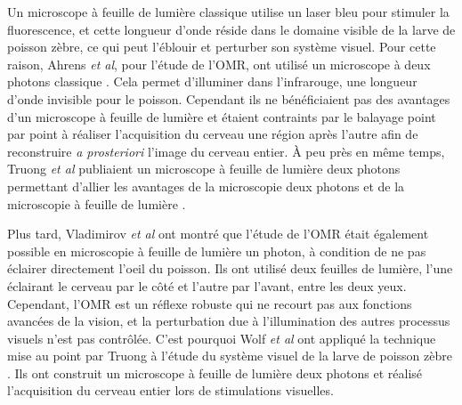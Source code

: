 Un microscope à feuille de lumière classique utilise un laser bleu pour stimuler la fluorescence, et cette longueur d'onde réside dans le domaine visible de la larve de poisson zèbre, ce qui peut l'éblouir et perturber son système visuel. Pour cette raison, Ahrens \emph{et al}, pour l'étude de l'OMR, ont utilisé un microscope à deux photons classique \cite{ahrens_brain-wide_2012}. Cela permet d'illuminer dans l'infrarouge, une longueur d'onde invisible pour le poisson. Cependant ils ne bénéficiaient pas des avantages d'un microscope à feuille de lumière et étaient contraints par le balayage point par point à réaliser l'acquisition du cerveau une région après l'autre afin de reconstruire \emph{a prosteriori} l'image du cerveau entier. À peu près en même temps, Truong \emph{et al} publiaient un microscope à feuille de lumière deux photons permettant d'allier les avantages de la microscopie deux photons et de la microscopie à feuille de lumière \cite{truong_deep_2011}.



Plus tard, Vladimirov \emph{et al} \cite{vladimirov_light-sheet_2014} ont montré que l'étude de l'OMR était également possible en microscopie à feuille de lumière un photon, à condition de ne pas éclairer directement l'oeil du poisson. Ils ont utilisé deux feuilles de lumière, l'une éclairant le cerveau par le côté et l'autre par l'avant, entre les deux yeux. Cependant, l'OMR est un réflexe robuste qui ne recourt pas aux fonctions avancées de la vision, et la perturbation due à l'illumination des autres processus visuels n'est pas contrôlée. C'est pourquoi Wolf \emph{et al} ont appliqué la technique mise au point par Truong à l'étude du système visuel de la larve de poisson zèbre \cite{wolf_whole-brain_2015}. Ils ont construit un microscope à feuille de lumière deux photons et réalisé l'acquisition du cerveau entier lors de stimulations visuelles.

